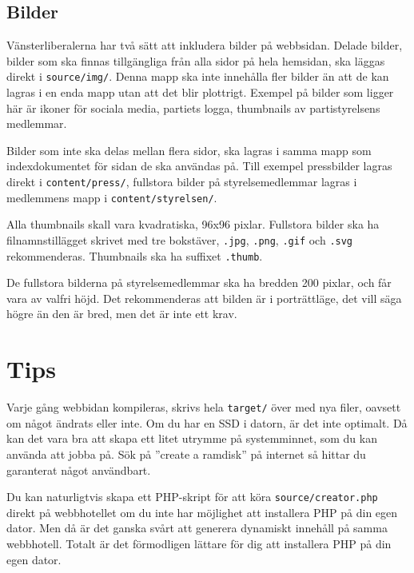 \documentclass[a4paper,10pt]{article}
\begin{document}
\subsection{Bilder}
Vänsterliberalerna har två sätt att inkludera bilder på webbsidan. Delade bilder, bilder som ska finnas tillgängliga från alla sidor på hela hemsidan, ska läggas direkt i {\tt source/img/}. Denna mapp ska inte innehålla fler bilder än att de kan lagras i en enda mapp utan att det blir plottrigt. Exempel på bilder som ligger här är ikoner för sociala media, partiets logga, thumbnails av partistyrelsens medlemmar. 

Bilder som inte ska delas mellan flera sidor, ska lagras i samma mapp som indexdokumentet för sidan de ska användas på. Till exempel pressbilder lagras direkt i {\tt content/press/}, fullstora bilder på styrelsemedlemmar lagras i medlemmens mapp i {\tt content/styrelsen/}. 

Alla thumbnails skall vara kvadratiska, 96x96 pixlar. Fullstora bilder ska ha filnamnstillägget skrivet med tre bokstäver, {\tt .jpg}, {\tt .png}, {\tt .gif} och {\tt .svg} rekommenderas. Thumbnails ska ha suffixet {\tt .thumb}. 

De fullstora bilderna på styrelsemedlemmar ska ha bredden 200 pixlar, och får vara av valfri höjd. Det rekommenderas att bilden är i porträttläge, det vill säga högre än den är bred, men det är inte ett krav. 

\section{Tips}
Varje gång webbidan kompileras, skrivs hela {\tt target/} över med nya filer, oavsett om något ändrats eller inte. Om du har en SSD i datorn, är det inte optimalt. Då kan det vara bra att skapa ett litet utrymme på systemminnet, som du kan använda att jobba på. Sök på ''create a ramdisk'' på internet så hittar du garanterat något användbart. 

Du kan naturligtvis skapa ett PHP-skript för att köra {\tt source/creator.php} direkt på webbhotellet om du inte har möjlighet att installera PHP på din egen dator. Men då är det ganska svårt att generera dynamiskt innehåll på samma webbhotell. Totalt är det förmodligen lättare för dig att installera PHP på din egen dator. 
\end{document}
